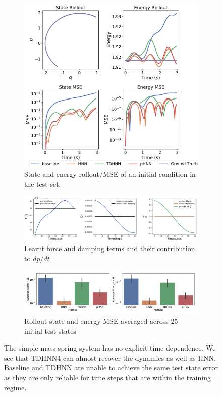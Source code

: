 \documentclass[twoside]{article}
\begin{document}
\begin{figure}[h!]
\centering
\captionsetup{justification=centering}
	\begin{subfigure}[b]{0.4\textwidth}
		\centering
		\includegraphics[width=\textwidth]{figures/figures/mass_spring/1/mass_spring_long_0.pdf}
		\caption{State and energy rollout/MSE of an initial condition in the test set.}
	\end{subfigure}
	\begin{subfigure}[b]{0.48\textwidth}
		\centering
		\includegraphics[width=\textwidth]{figures/figures/mass_spring/1/mass_spring_dpdt_0.pdf}
		\caption{Learnt force and damping terms and their contribution to $dp/dt$}
	\end{subfigure}
	\begin{subfigure}[b]{0.48\textwidth}
	    \centering
		\includegraphics[width=\textwidth]{figures/figures/mass_spring/1/mass_spring_errors_0.pdf}
		\caption{Rollout state and energy MSE averaged across 25 initial test states}
	\end{subfigure}
\caption{The simple mass spring system has no explicit time dependence. We see that TDHNN4 can almost recover the dynamics as well as HNN. Baseline and TDHNN are unable to achieve the same test state error as they are only reliable for time steps that are within the training regime.}
\label{mspring}
\end{figure}
\end{document}
